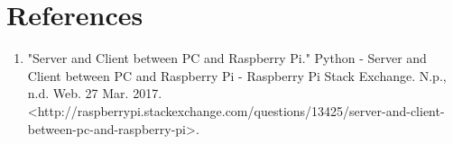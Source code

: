 \section{References}

\begin{enumerate}
\item "Server and Client between PC and Raspberry Pi." Python - Server and Client between PC and Raspberry Pi - Raspberry Pi Stack Exchange. N.p., n.d. Web. 27 Mar. 2017. <http://raspberrypi.stackexchange.com/questions/13425/server-and-client-between-pc-and-raspberry-pi>.

\end{enumerate}